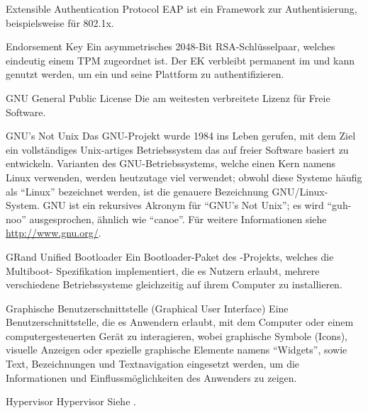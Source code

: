 

          {Extensible Authentication Protocol}
    {EAP ist ein Framework zur Authentisierung, beispielsweise f\"ur 802.1x.}


          {Endorsement Key}
          {Ein asymmetrisches 2048-Bit RSA-Schl\"usselpaar, welches eindeutig einem TPM zugeordnet ist. 
	  Der EK verbleibt permanent im \TPM und kann genutzt werden, um ein \TPM und seine Plattform zu authentifizieren.
	  }

          {GNU General Public License}
          {Die am weitesten verbreitete Lizenz f\"ur Freie Software.}

          {GNU's Not Unix}
    {Das GNU-Projekt wurde 1984 ins Leben gerufen, mit dem Ziel ein 
    vollst\"andiges Unix-artiges Betriebssystem das auf freier Software basiert
     zu entwickeln.
     Varianten des GNU-Betriebssystems, welche einen Kern namens Linux
     verwenden, werden heutzutage viel verwendet; obwohl diese Systeme h\"aufig
     als ``Linux'' bezeichnet werden, ist die genauere Bezeichnung GNU/Linux-
     System. GNU ist ein rekursives Akronym f\"ur ``GNU's Not Unix''; es wird
     ``guh-noo'' ausgesprochen, \"ahnlich wie ``canoe''. F\"ur weitere
     Informationen siehe \url{http://www.gnu.org/}.}

          {GRand Unified Bootloader}
    {Ein Bootloader-Paket des \GNU-Projekts, welches die Multiboot-
     Spezifikation implementiert, die es Nutzern erlaubt, mehrere verschiedene
     Betriebssysteme gleichzeitig auf ihrem Computer zu installieren.}

          {Graphische Benutzerschnittstelle (Graphical User Interface)}
    {Eine Benutzerschnittstelle, die es Anwendern erlaubt, mit dem Computer
     oder einem computergesteuerten Ger\"at  zu interagieren, wobei graphische
     Symbole (Icons), visuelle Anzeigen oder spezielle graphische Elemente
     namens ``Widgets'', sowie Text, Bezeichnungen und Textnavigation
     eingesetzt werden, um die Informationen und Einflussm\"oglichkeiten des
     Anwenders zu zeigen.}

\glosentry
          {Hypervisor}
          {Hypervisor}
    {Siehe \VirtualMachineMonitor.}


